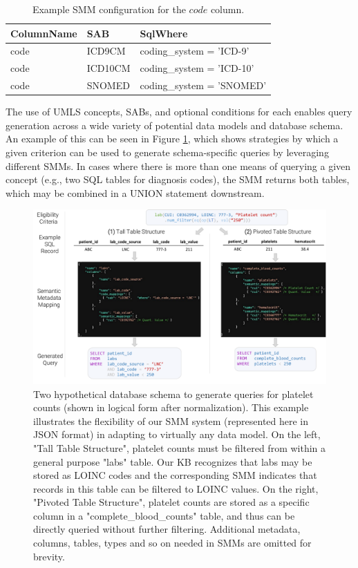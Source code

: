 \documentclass[../main.tex]{subfiles}
\begin{document}
\def\arraystretch{0.8}
\begin{table}[h!]
\centering
\begin{tabular}{l l l}
 \toprule
 \textbf{ColumnName} & \textbf{SAB} & \textbf{SqlWhere} \\
 \hline
    code & ICD9CM  & coding\_system = 'ICD-9' \\
    code & ICD10CM & coding\_system = 'ICD-10' \\
    code & SNOMED  & coding\_system = 'SNOMED' \\
 \hline
\end{tabular}
\caption{Example SMM configuration for the $code$ column. } 
\label{tbl_smm_column_config}
\end{table}

The use of UMLS concepts, SABs, and optional conditions for each enables query generation across a wide variety of potential data models and database schema. An example of this can be seen in Figure \ref{fig_leafai_smm}, which shows strategies by which a given criterion can be used to generate schema-specific queries by leveraging different SMMs. In cases where there is more than one means of querying a given concept (e.g., two SQL tables for diagnosis codes), the SMM returns both tables, which may be combined in a UNION statement downstream.

\begin{figure}[h!]
  \includegraphics[scale=0.47]{Figures/6_smm/leafai_smm.pdf}  
\caption{Two hypothetical database schema to generate queries for platelet counts (shown in logical form after normalization). This example illustrates the flexibility of our SMM system (represented here in JSON format) in adapting to virtually any data model. On the left, "Tall Table Structure", platelet counts must be filtered from within a general purpose "labs" table. Our KB recognizes that labs may be stored as LOINC codes and the corresponding SMM indicates that records in this table can be filtered to LOINC values. On the right, "Pivoted Table Structure", platelet counts are stored as a specific column in a "complete\_blood\_counts" table, and thus can be directly queried without further filtering. Additional metadata, columns, tables, types and so on needed in SMMs are omitted for brevity.}
\label{fig_leafai_smm}
\end{figure}
\end{document}
